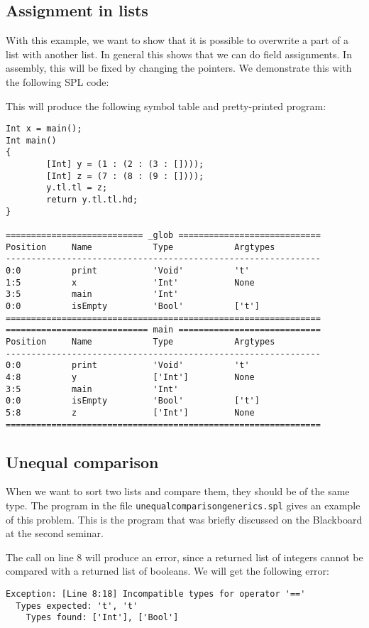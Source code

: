 \documentclass[a4paper]{article}
\begin{document}
\subsection{Assignment in lists}
With this example, we want to show that it is possible to overwrite a part of a list with another list. In general this shows that we can do field assignments. In assembly, this will be fixed by changing the pointers. We demonstrate this with the following SPL code:

This will produce the following symbol table and pretty-printed program: 
\begin{verbatim}
Int x = main();
Int main()
{
        [Int] y = (1 : (2 : (3 : [])));
        [Int] z = (7 : (8 : (9 : [])));
        y.tl.tl = z;
        return y.tl.tl.hd;
}

=========================== _glob ============================
Position     Name            Type            Argtypes            
--------------------------------------------------------------
0:0          print           'Void'          't'                 
1:5          x               'Int'           None                
3:5          main            'Int'                               
0:0          isEmpty         'Bool'          ['t']               
==============================================================
============================ main ============================
Position     Name            Type            Argtypes            
--------------------------------------------------------------
0:0          print           'Void'          't'                 
4:8          y               ['Int']         None                
3:5          main            'Int'                               
0:0          isEmpty         'Bool'          ['t']               
5:8          z               ['Int']         None                
==============================================================
\end{verbatim}



\subsection{Unequal comparison}
When we want to sort two lists and compare them, they should be of the same type. The program in the file {\tt unequalcomparisongenerics.spl} gives an example of this problem. This is the program that was briefly discussed on the Blackboard at the second seminar.

The call on line 8 will produce an error, since a returned list of integers cannot be compared with a returned list of booleans. We will get the following error: 
\begin{verbatim}
Exception: [Line 8:18] Incompatible types for operator '=='
  Types expected: 't', 't'
    Types found: ['Int'], ['Bool']
\end{verbatim}
\end{document}
